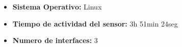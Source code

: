 \begin{itemize}
\item \textbf{Sistema Operativo:} Linux
\item \textbf{Tiempo de actividad del sensor:} 3h 51min 24seg
\item \textbf{Numero de interfaces:} 3
\end{itemize}
